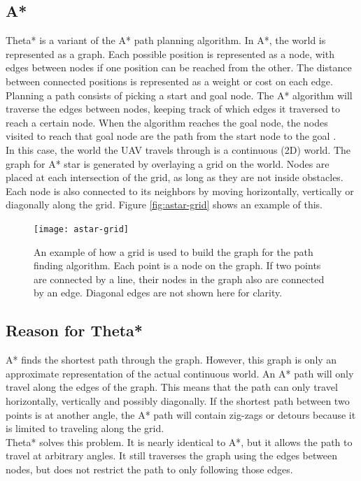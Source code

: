 \subsection{A*}
Theta* is a variant of the A* path planning algorithm. In A*, the world is represented as a graph. Each possible position is represented as a node, with edges between nodes if one position can be reached from the other. The distance between connected positions is represented as a weight or cost on each edge. \\
Planning a path consists of picking a start and goal node. The A* algorithm will traverse the edges between nodes, keeping track of which edges it traversed to reach a certain node. When the algorithm reaches the goal node, the nodes visited to reach that goal node are the path from the start node to the goal . \\
In this case, the world the UAV travels through is a continuous (2D) world. The graph for A* star is generated by overlaying a grid on the world. Nodes are placed at each intersection of the grid, as long as they are not inside obstacles. Each node is also connected to its neighbors by moving horizontally, vertically or diagonally along the grid. Figure \ref{fig:astar-grid} shows an example of this.
\begin{figure}
\centering
\texttt{[image: astar-grid]}
\caption[The grid used to build the graph for the Theta* algorithm]{An example of how a grid is used to build the graph for the path finding algorithm. Each point is a node on the graph. If two points are connected by a line, their nodes in the graph also are connected by an edge. Diagonal edges are not shown here for clarity.}
\label{figure:astar-grid}
\end{figure}

\subsection{Reason for Theta*}
A* finds the shortest path through the graph. However, this graph is only an approximate representation of the actual continuous world. An A* path will only travel along the edges of the graph. This means that the path can only travel horizontally, vertically and possibly diagonally. If the shortest path between two points is at another angle, the A* path will contain zig-zags or detours because it is limited to traveling along the grid. \\
Theta* solves this problem. It is nearly identical to A*, but it allows the path to travel at arbitrary angles. It still traverses the graph using the edges between nodes, but does not restrict the path to only following those edges.

